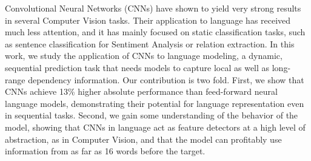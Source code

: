 Convolutional Neural Networks (CNNs) have shown to yield very strong results in several Computer Vision tasks. Their application to language has received much less attention, and it has mainly focused on static classification tasks, such as sentence classification for Sentiment Analysis or relation extraction. In this work, we study the application of CNNs to language modeling, a dynamic, sequential prediction task that needs models to capture local as well as long-range dependency information. Our contribution is two fold. First, we show that CNNs achieve 13\% higher absolute performance than feed-forward neural language models, demonstrating their potential for language representation even in sequential tasks. Second, we gain some understanding of the behavior of the model, showing that CNNs in language act as feature detectors at a high level of abstraction, as in Computer Vision, and that the model can profitably use information from as far as 16 words before the target.
